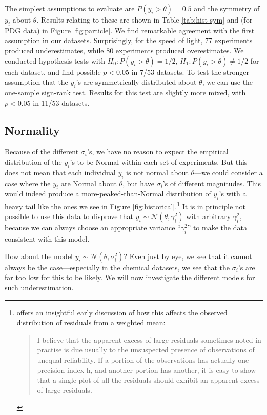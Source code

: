 \documentclass[letterpaper,12pt]{article}
\begin{document}
The simplest assumptions to evaluate are $P(y_i>\theta)=0.5$ and the symmetry of $y_i$ about $\theta$. Results relating to these are shown in Table \ref{tab:hist-sym} and (for PDG data) in Figure \ref{fig:particle}. We find remarkable agreement with the first assumption in our datasets. Surprisingly, for the speed of light, 77 experiments produced underestimates, while 80 experiments produced overestimates. We conducted hypothesis tests with $H_0: P(y_i>\theta)=1/2$, $H_1: P(y_i>\theta)\neq 1/2$ for each dataset, and find possible $p<0.05$ in 7/53 datasets. To test the stronger assumption that the $y_i$'s are symmetrically distributed about $\theta$, we can use the one-sample sign-rank test. Results for this test are slightly more mixed, with $p<0.05$ in 11/53 datasets.

\subsection{Normality}

Because of the different $\sigma_i$'s, we have no reason to expect the empirical distribution of the $y_i$'s to be Normal within each set of experiments. But this does not mean that each individual $y_i$ is not normal about $\theta$---we could consider a case where the $y_i$ are Normal about $\theta$, but have $\sigma_i$'s of different magnitudes. This would indeed produce a more-peaked-than-Normal distribution of $y_i$'s with a heavy tail like the ones we see in Figure \ref{fig:historical}.\footnote{
\citet{birge1932calculation} offers an insightful early discussion of how this affects the observed distribution of residuals from a weighted mean:
\begin{quote}
I believe that the apparent excess of large residuals sometimes noted in practise is due usually to the unsuspected presence of observations of unequal reliability. If a portion of the observations has actually one precision index h, and another portion has another, it is easy to show that a single plot of all the residuals should exhibit an apparent excess of large residuals. \hfill --\citet[pg.~213]{birge1932calculation}
\end{quote}
} It is in principle not possible to use this data to disprove that $y_i\sim\mathcal{N}(\theta,\gamma^2_i)$ with arbitrary $\gamma^2_i$, because we can always choose an appropriate variance ``$\gamma^2_i$'' to make the data consistent with this model.

How about the model $y_i\sim\mathcal{N}(\theta,\sigma_i^2)$? Even just by eye, we see that it cannot always be the case---especially in the chemical datasets, we see that the $\sigma_i$'s are far too low for this to be likely. We will now investigate the different models for such underestimation.
\end{document}
